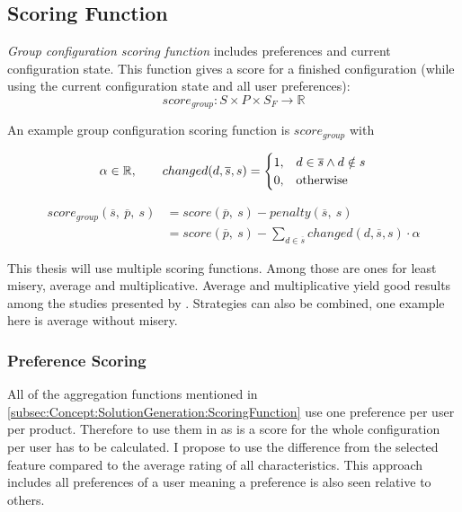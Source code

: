 \begin{samepage}
\subsection{Scoring Function}
\label{subsec:Concept:SolutionGeneration:ScoringFunction}
\emph{Group configuration scoring function} includes preferences and current configuration state. This function gives a score for a finished configuration (while using the current configuration state and all user preferences):
\begin{equation}
    score_{group}: S \times P \times S_F \to \mathbb{R}
\end{equation}

An example group configuration scoring function is $score_{group}$ with

\begin{equation}
    \notag \alpha \in \mathbb{R}, \qquad     changed(d,\overline{s}, s) = 
    \begin{cases}
      1, & d \in \overline{s} \land d \notin s \\
      0, & \text{otherwise}
    \end{cases}
\end{equation}

\begin{equation}
    \begin{split}
        score_{group}(\overline{s},\ \overline{p},\ s)
        & = score(\overline{p},\ s) - penalty(\overline{s},\ s) \\
        & = score(\overline{p},\ s) - \sum_{d \in \overline{s}} changed(d,\overline{s}, s) \cdot \alpha
    \end{split}
\end{equation}

This thesis will use multiple scoring functions. Among those are ones for least misery, average and multiplicative. Average and multiplicative yield good results among the studies presented by \citeauthor{Masthoff2015} \cite{Masthoff2015}. Strategies can also be combined, one example here is average without misery.
\end{samepage}

\subsubsection{Preference Scoring}

All of the aggregation functions mentioned in \autoref{subsec:Concept:SolutionGeneration:ScoringFunction} use one preference per user per product. Therefore to use them in as is a score for the whole configuration per user has to be calculated. I propose to use the difference from the selected feature compared to the average rating of all characteristics. This approach includes all preferences of a user meaning a preference is also seen relative to others.

